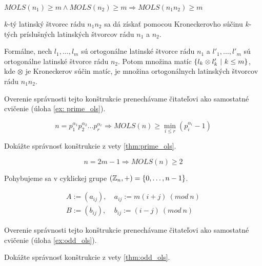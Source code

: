 \begin{theorem}
\label{thm:prime_ols}
$MOLS(n_1) \geq m \wedge MOLS(n_2) \geq m \Rightarrow MOLS(n_1 n_2) \geq m$
\end{theorem}

\begin{construction}
$k$-tý latinský štvorec rádu $n_1 n_2$ sa dá získať pomocou Kroneckerovho súčinu $k$-tých príslušných latinských štvorcov rádu $n_1$ a $n_2$.

Formálne, nech $l_1, \ldots, l_m$ sú ortogonálne latinské štvorce rádu $n_1$ a $l'_1, \ldots, l'_m$ sú ortogonálne latinské štvorce rádu $n_2$.
Potom množina matíc $\left\{l_k \otimes l'_k ~|~ k \leq m\right\}$, kde $\otimes$ je Kroneckerov súčin matíc, je množina ortogonálnych latinských štvorcov rádu $n_1 n_2$.

Overenie správnosti tejto konštrukcie prenechávame čitateľovi ako samostatné cvičenie (úloha \ref{ex: prime_ols}).
\end{construction}

\begin{corollary}
$$n = p_1^{\alpha_1} p_2^{\alpha_2} \ldots p_r^{\alpha_r} \Rightarrow MOLS(n) \geq \min_{i \leq r} (p_i^{\alpha_i} - 1)$$
\end{corollary}


\begin{exercise}
\label{ex: prime_ols}
Dokážte správnosť konštrukcie z vety \ref{thm:prime_ols}.
\end{exercise}


\begin{theorem}
\label{thm:odd_ols}
$$n = 2m - 1 \Rightarrow MOLS(n) \geq 2$$
\end{theorem}

\begin{construction}

Pohybujeme sa v cyklickej grupe $(\mathbb{Z}_n, +) = \left\{0, \ldots, n-1\right\}$.

\begin{align*}
A := (a_{ij}),~& a_{ij} := m (i+j)~(mod~n) \\
B := (b_{ij}),~& b_{ij} := (i-j)  ~(mod~n)    
\end{align*}

Overenie správnosti tejto konštrukcie prenechávame čitateľovi ako samostatné cvičenie (úloha \ref{ex:odd_ols}).
\end{construction}


\begin{exercise}
\label{ex:odd_ols}
Dokážte správnosť konštrukcie z vety \ref{thm:odd_ols}.
\end{exercise}
